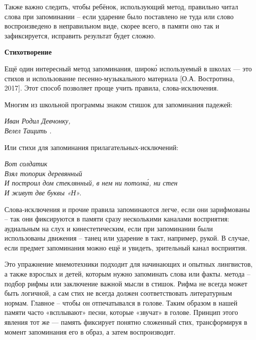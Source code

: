 Также важно следить, чтобы ребёнок, использующий метод, правильно читал слова при запоминании – если ударение было поставлено не туда или слово воспроизведено в неправильном виде, скорее всего, в памяти оно так и зафиксируется, исправить результат будет сложно.

\textbf{Стихотворение}

Ещё один интересный метод запоминания, широк\'{о} используемый в школах --- это  стихов и использование песенно-музыкального материала [О.А. Востротина, 2017]. Этот способ позволяет проще учить правила, слова-исключения.

Многим из школьной программы знаком стишок для запоминания падежей:

\begin{center}\it
    Иван Родил Девчонку,\\
    Велел Тащить .
\end{center}

Или стихи для запоминания прилагательных-исключений:

\begin{center}
    \it Вот солдатик \\
    Взял топорик деревянный\\
    И построил дом стеклянный, в нем ни потолк\'{а}, ни стен\\
    И живут две буквы «Н».
\end{center}

Слова-исключения и прочие правила запоминаются легче, если они зарифмованы – так они фиксируются в памяти сразу несколькими каналами восприятия: аудиальным на слух и кинестетическим, если при запоминании были использованы движения – танец или ударение в такт, например, рукой. В случае, если предмет запоминания можно ещё и увидеть,  зрительный канал восприятия.

Это упражнение мнемотехники подходит для начинающих и опытных лингвистов, а также взрослых и детей, которым нужно запоминать слова или факты.  метода – подбор рифмы или заключение важной мысли в стишок. Рифма не всегда может быть логичной, а сам стих не всегда должен соответствовать литературным нормам. Главное – чтобы он отпечатывался в голове. Таким образом в нашей памяти часто «всплывают» песни, которые   «звучат» в голове. Принцип этого явления тот же --- память фиксирует понятно сложенный стих, трансформируя в момент запоминания его в образ, а затем воспроизводит.


